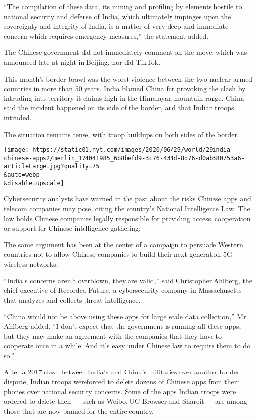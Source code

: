 ``The compilation of these data, its mining and profiling by elements
hostile to national security and defense of India, which ultimately
impinges upon the sovereignty and integrity of India, is a matter of
very deep and immediate concern which requires emergency measures,'' the
statement added.

The Chinese government did not immediately comment on the move, which
was announced late at night in Beijing, nor did TikTok.

This month's border brawl was the worst violence between the two
nuclear-armed countries in more than 50 years. India blamed China for
provoking the clash by intruding into territory it claims high in the
Himalayan mountain range. China said the incident happened on its side
of the border, and that Indian troops intruded.

The situation remains tense, with troop buildups on both sides of the
border.

\texttt{[image: https://static01.nyt.com/images/2020/06/29/world/29india-chinese-apps2/merlin\_174041985\_6b8befd9-3c76-434d-8d76-d0ab380753a6-articleLarge.jpg?quality=75\\\&auto=webp\\\&disable=upscale]}

Cybersecurity analysts have warned in the past about the risks Chinese
apps and telecom companies may pose, citing the country's
\href{https://www.lawfareblog.com/beijings-new-national-intelligence-law-defense-offense}{National
Intelligence Law}. The law holds Chinese companies legally responsible
for providing access, cooperation or support for Chinese intelligence
gathering.

The same argument has been at the center of a campaign to persuade
Western countries not to allow Chinese companies to build their
next-generation 5G wireless networks.

``India's concerns aren't overblown, they are valid,'' said Christopher
Ahlberg, the chief executive of Recorded Future, a cybersecurity company
in Massachusetts that analyzes and collects threat intelligence.

``China would not be above using these apps for large scale data
collection,'' Mr. Ahlberg added. ``I don't expect that the government is
running all these apps, but they may make an agreement with the
companies that they have to cooperate once in a while. And it's easy
under Chinese law to require them to do so.''

After
\href{https://www.nytimes.com/2017/07/26/world/asia/dolam-plateau-china-india-bhutan.html}{a
2017 clash} between India's and China's militaries over another border
dispute, Indian troops
were\href{https://theprint.in/defence/troops-told-to-format-smartphones-delete-42-apps-after-chinese-spyware-threat/19042/}{forced
to delete dozens of Chinese apps} from their phones over national
security concerns. Some of the apps Indian troops were ordered to delete
then --- such as Weibo, UC Browser and Shareit --- are among those that
are now banned for the entire country.

